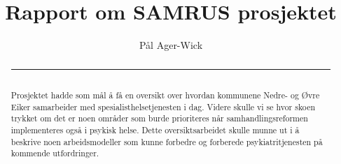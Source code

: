 \documentclass[11pt]{report} %
\title{Rapport om SAMRUS prosjektet}
\author{Pål Ager-Wick}
\begin{document}
\pagecolor{f_page}\afterpage{\nopagecolor}
\maketitle



              \renewcommand{\abstractname}{Oppsummering}

              \begin{abstract}
              \rule{\textwidth}{1pt}\\%
              Prosjektet hadde som mål å få en oversikt over hvordan kommunene Nedre- og Øvre Eiker samarbeider med spesialisthelsetjenesten i dag. Videre skulle vi se hvor skoen trykket om det er noen områder som burde prioriteres når samhandlingsreformen implementeres også i psykisk helse. Dette oversiktsarbeidet skulle munne ut i å beskrive noen arbeidsmodeller som kunne forbedre og forberede psykiatritjenesten på kommende utfordringer. 


\end{abstract}
\end{document}
